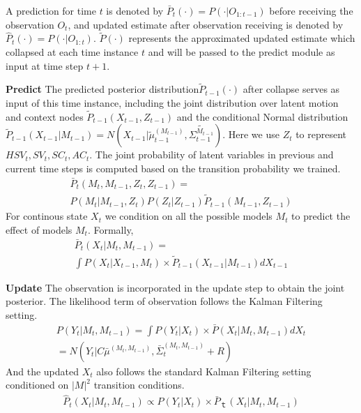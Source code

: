 \documentclass[10pt,twocolumn,letterpaper]{article}
\begin{document}
    A prediction for time $t$ is denoted by $\bar{P}_t(\cdot)=P(\cdot|O_{1:t-1})$ before
    receiving the observation $O_t$, and updated estimate after observation receiving is 
    denoted by $\hat{P}_t(\cdot) = P(\cdot|O_{1:t})$. $\tilde{P}(\cdot)$  
    represents the approximated updated estimate which collapsed at each time instance $t$
    and will be passed to the predict module as input at time step $t+1$.\newline

    \noindent
    \textbf{Predict}
    The predicted posterior distribution$\tilde{P}_{t-1}(\cdot)$ after collapse serves as input of
    this time instance, including the joint distribution over latent motion and context nodes
    $\tilde{P}_{t-1}(X_{t-1},Z_{t-1})$ and the conditional Normal distribution
     $\tilde{P}_{t-1}(X_{t-1}|M_{t-1}) = N(X_{t-1}|\tilde{\mu}_{t-1}^{(M_{t-1})}, \tilde{\Sigma_{t-1}^{M_{t-1}}})$.
    Here we use $Z_t$ to represent ${HSV_t, SV_t, SC_t, AC_t}$.
    The joint probability of latent variables in previous and current time steps is computed based on
    the transition probability we trained. 
    \begin{eqnarray*}
        \bar{P}_t(M_t, M_{t-1}, Z_t, Z_{t-1}) =\\
         P(M_t|M_{t-1}, Z_t)P(Z_t|Z_{t-1})\tilde{P}_{t-1}(M_{t-1}, Z_{t-1})
    \end{eqnarray*}
    For continous state $X_t$ we condition on all the possible models $M_t$ to predict the effect
    of models $M_t$. Formally, 
    \begin{eqnarray*}
        \bar{P}_t(X_t|M_t, M_{t-1}) =\\
         \int P(X_t|X_{t-1}, M_t) \times \tilde{P}_{t-1}(X_{t-1}|M_{t-1})dX_{t-1}
    \end{eqnarray*}

    \noindent
    \textbf{Update}
    The observation is incorporated in the update step to obtain the joint posterior. The likelihood
    term of observation follows the Kalman Filtering setting.
    \begin{eqnarray*}
        P(Y_t|M_t, M_{t-1}) = \int P(Y_t|X_t)\times \bar{P}(X_t|M_t,M_{t-1}) dX_t \\
        = N(Y_t|C\bar{\mu}^{(M_t,M_{t-1})}, \bar{\Sigma}_t^{(M_t, M_{t-1})} + R)
    \end{eqnarray*}
    And the updated $X_t$ also follows the standard Kalman Filtering setting conditioned on $|M|^2$ transition
    conditions. 
    \begin{eqnarray*}
        \hat{P}_t(X_t|M_t,M_{t-1}) \propto P(Y_t|X_t)\times \bar{P}_ｔ(X_t|M_t,M_{t-1})
    \end{eqnarray*}
\end{document}
